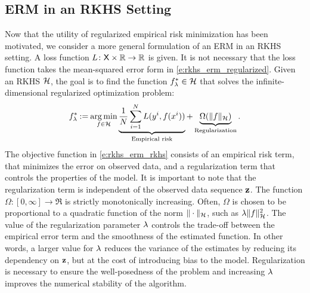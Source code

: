 \subsection{ERM in an RKHS Setting}
\label{s:erm_rkhs}
Now that the utility of regularized empirical risk minimization has been motivated, we consider a more general formulation of an ERM in an RKHS setting. A loss function $L \colon  {\sf X}\times \mathbb{R} \to\mathbb{R}$ is given. It is not necessary that the loss function takes the mean-squared error form in \eqref{e:rkhs_erm_regularized}. Given an RKHS ${\cal H}$, the goal is to find the function $f_\lambda^*\in{\cal H}$ that solves the infinite-dimensional regularized optimization problem:
\begin{equation}
f_\reg^* \eqdef \argmin_{f\in\clH} \underbrace{\frac{1}{N} \sum_{i=1}^N L(y^i,  f(x^i))}_{\text{Empirical risk}}    + \underbrace{\Omega(\| f\|_{\clH})}_{\text{Regularization}}.
\label{e:rkhs_erm_rkhs}
\end{equation}
The objective function in \eqref{e:rkhs_erm_rkhs} consists of an empirical risk term, that minimizes the error on observed data, and a regularization term that controls the properties of the model. It is important to note that the regularization term is independent of the observed data sequence $\bf{z}$. The function $\Omega : [0, \infty] \to \Re$ is strictly monotonically increasing. Often, $\Omega$ is chosen to be proportional to a quadratic function of the norm $\|\cdot\|_{\cal H}$, such as $\lambda \|f\|^2_{\cal H}$.  The value of the regularization parameter $\lambda$ controls the trade-off between the empirical error term and the smoothness of the estimated function. In other words, a larger value for $\lambda$ reduces the variance of the estimates by reducing its dependency on $\bf{z}$, but at the cost of introducing bias to the model. Regularization is necessary to ensure the well-posedness of the problem and increasing $\lambda$ improves the numerical stability of the algorithm. 

